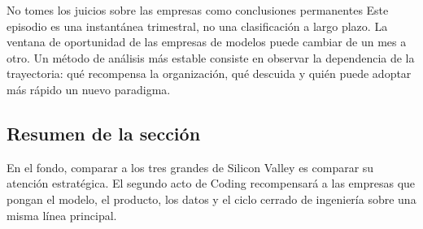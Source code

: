 \begin{warningbox}{No tomes los juicios sobre las empresas como conclusiones permanentes}
Este episodio es una instantánea trimestral, no una clasificación a largo plazo. La ventana de oportunidad de las empresas de modelos puede cambiar de un mes a otro. Un método de análisis más estable consiste en observar la dependencia de la trayectoria: qué recompensa la organización, qué descuida y quién puede adoptar más rápido un nuevo paradigma.
\end{warningbox}

\subsection{Resumen de la sección}

En el fondo, comparar a los tres grandes de Silicon Valley es comparar su atención estratégica. El segundo acto de Coding recompensará a las empresas que pongan el modelo, el producto, los datos y el ciclo cerrado de ingeniería sobre una misma línea principal.
